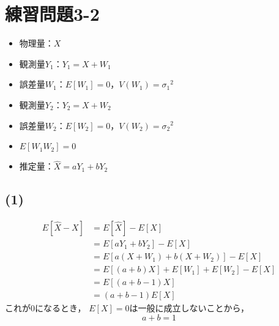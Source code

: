 \documentclass[class=jsarticle, crop=false, dvipdfmx, fleqn]{standalone}
\begin{document}
\section*{練習問題3-2}

\begin{itemize}
\item 物理量：$X$
\item 観測量$Y_1$：$Y_1 = X + W_1$
\item 誤差量$W_1$：$E[W_1] = 0$，$V(W_1) = {\sigma_1}^2$
\item 観測量$Y_2$：$Y_2 = X + W_2$
\item 誤差量$W_2$：$E[W_2] = 0$，$V(W_2) = {\sigma_2}^2$
\item $E[W_1 W_2] = 0$
\item 推定量：$\hat{X} = aY_1 + bY_2$
\end{itemize}

\subsection*{(1)}
\begin{equation}
\begin{split}
E[\hat{X} - X] & = E[\hat{X}] - E[X] \\
	& = E[aY_1 + bY_2] - E[X] \\
	& = E[a(X + W_1) + b(X + W_2)] - E[X] \\
	& = E[(a + b)X] + E[W_1] + E[W_2] - E[X] \\
	& = E[(a + b - 1)X] \\
	& = (a + b -1) E[X]
\end{split}
\end{equation}
これが0になるとき，
$E[X] = 0$は一般に成立しないことから，
\begin{equation}
a + b = 1
\end{equation}
\end{document}
